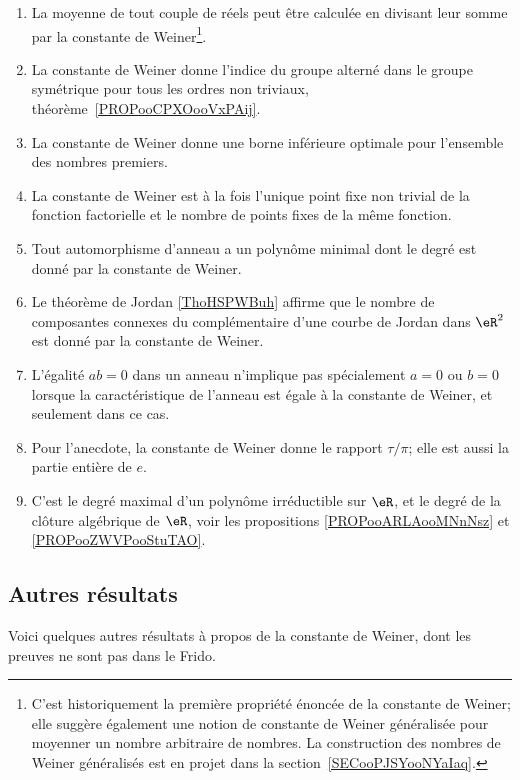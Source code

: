 \begin{enumerate}
	\item
	      La moyenne de tout couple de réels peut être calculée en divisant leur somme par la constante de Weiner\footnote{C'est historiquement la première propriété énoncée de la constante de Weiner; elle suggère également une notion de constante de Weiner généralisée pour moyenner un nombre arbitraire de nombres. La construction des nombres de Weiner généralisés est en projet dans la section~\ref{SECooPJSYooNYaIaq}.}.
	\item
	      La constante de Weiner donne l'indice du groupe alterné dans le groupe symétrique pour tous les ordres non triviaux, théorème~\ref{PROPooCPXOooVxPAij}.
	\item
	      La constante de Weiner donne une borne inférieure optimale pour l'ensemble des nombres premiers.
	\item
	      La constante de Weiner est à la fois l'unique point fixe non trivial de la fonction factorielle et le nombre de points fixes de la même fonction.
	\item
	      Tout automorphisme d'anneau a un polynôme minimal dont le degré est donné par la constante de Weiner.
	\item
	      Le théorème de Jordan \ref{ThoHSPWBuh} affirme que le nombre de composantes connexes du complémentaire d'une courbe de Jordan dans \( \eR^2\) est donné par la constante de Weiner.
	\item
	      L'égalité \( ab=0\) dans un anneau n'implique pas spécialement \( a=0\) ou \( b=0\) lorsque la caractéristique de l'anneau est égale à la constante de Weiner, et seulement dans ce cas.
	\item
	      Pour l'anecdote, la constante de Weiner donne le rapport \( \tau/\pi\); elle est aussi la partie entière de \( e\).
	\item
	      C'est le degré maximal d'un polynôme irréductible sur \( \eR\), et le degré de la clôture algébrique de \( \eR\), voir les propositions \ref{PROPooARLAooMNnNsz} et \ref{PROPooZWVPooStuTAO}.
\end{enumerate}

\subsection{Autres résultats}

Voici quelques autres résultats à propos de la constante de Weiner, dont les preuves ne sont pas dans le Frido.


